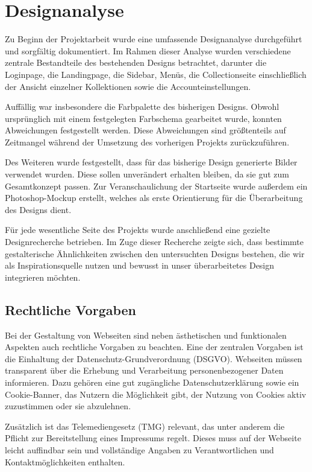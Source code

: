 \section{Designanalyse}\label{sec:section-three}

Zu Beginn der Projektarbeit wurde eine umfassende Designanalyse durchgeführt und sorgfältig dokumentiert.
Im Rahmen dieser Analyse wurden verschiedene zentrale Bestandteile des bestehenden Designs betrachtet, darunter die Loginpage, die Landingpage, die Sidebar, Menüs, die Collectionseite einschließlich der Ansicht einzelner Kollektionen sowie die Accounteinstellungen.

Auffällig war insbesondere die Farbpalette des bisherigen Designs.
Obwohl ursprünglich mit einem festgelegten Farbschema gearbeitet wurde, konnten Abweichungen festgestellt werden.
Diese Abweichungen sind größtenteils auf Zeitmangel während der Umsetzung des vorherigen Projekts zurückzuführen.

Des Weiteren wurde festgestellt, dass für das bisherige Design generierte Bilder verwendet wurden.
Diese sollen unverändert erhalten bleiben, da sie gut zum Gesamtkonzept passen.
Zur Veranschaulichung der Startseite wurde außerdem ein Photoshop-Mockup erstellt, welches als erste Orientierung für die Überarbeitung des Designs dient.

Für jede wesentliche Seite des Projekts wurde anschließend eine gezielte Designrecherche betrieben.
Im Zuge dieser Recherche zeigte sich, dass bestimmte gestalterische Ähnlichkeiten zwischen den untersuchten Designs bestehen, die wir als Inspirationsquelle nutzen und bewusst in unser überarbeitetes Design integrieren möchten.

\subsection{Rechtliche Vorgaben}\label{subsec:subsection-three-one}

Bei der Gestaltung von Webseiten sind neben ästhetischen und funktionalen Aspekten auch rechtliche Vorgaben zu beachten.
Eine der zentralen Vorgaben ist die Einhaltung der Datenschutz-Grundverordnung (DSGVO).
Webseiten müssen transparent über die Erhebung und Verarbeitung personenbezogener Daten informieren.
Dazu gehören eine gut zugängliche Datenschutzerklärung sowie ein Cookie-Banner, das Nutzern die Möglichkeit gibt, der Nutzung von Cookies aktiv zuzustimmen oder sie abzulehnen.

Zusätzlich ist das Telemediengesetz (TMG) relevant, das unter anderem die Pflicht zur Bereitstellung eines Impressums regelt.
Dieses muss auf der Webseite leicht auffindbar sein und vollständige Angaben zu Verantwortlichen und Kontaktmöglichkeiten enthalten.

